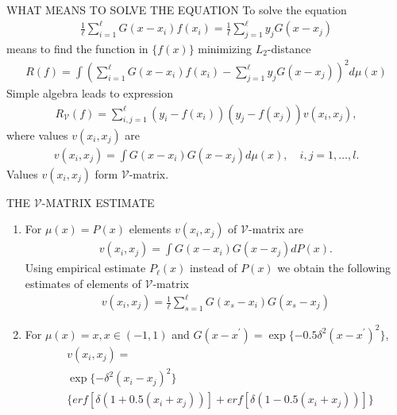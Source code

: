 \documentclass[11pt]{beamer}
\begin{document}
\begin{frame}{WHAT MEANS TO SOLVE THE EQUATION}
To solve the equation
\begin{align*}
\frac{1}{\ell}\sum_{i=1}^{\ell}G(x-x_{i})f(x_{i}) = \frac{1}{\ell}\sum_{j=1}^{\ell}y_{j}G(x-x_{j})
\end{align*}
means to find the function in $\{f(x)\}$ minimizing $L_{2}$-distance
\begin{align*}
R(f) = \int \left( \sum_{i=1}^{\ell}G(x-x_{i})f(x_{i}) - \sum_{j=1}^{\ell}y_{j}G(x-x_{j}) \right)^{2}d\mu(x)
\end{align*}
Simple algebra leads to expression
\begin{align*}
R_{\mathcal{V}}(f) = \sum_{i,j = 1}^{\ell}(y_{i} - f(x_{i}))(y_{j} - f(x_{j}))v(x_{i}, x_{j}),
\end{align*}
where values $v(x_{i}, x_{j})$ are
\begin{align*}
v(x_{i}, x_{j}) = \int G(x-x_{i})G(x-x_{j})d\mu(x), \quad i,j=1,\ldots,l.
\end{align*}
Values $v(x_{i}, x_{j})$ form $\mathcal{V}$-matrix.
\end{frame}


\begin{frame}{THE $\mathcal{V}$-MATRIX ESTIMATE}
\begin{enumerate}
\item For $\mu(x) = P(x)$ elements $v(x_{i}, x_{j})$ of $\mathcal{V}$-matrix are
\begin{align*}
v(x_{i}, x_{j}) = \int G(x-x_{i})G(x-x_{j})dP(x).
\end{align*}
Using empirical estimate $P_{\ell}(x)$ instead of $P(x)$ we obtain the following estimates of elements of $\mathcal{V}$-matrix
\begin{align*}
v(x_{i}, x_{j}) = \frac{1}{\ell}\sum_{s=1}^{\ell}G(x_{s} - x_{i})G(x_{s} - x_{j})
\end{align*}
\item For $\mu(x) = x, x \in (-1, 1)$ and $G(x-x^{\prime}) = \exp\{-0.5\delta^{2}(x-x^{\prime})^{2}\}$,
\begin{align*}
&v(x_{i}, x_{j}) = \\ 
&\exp\{-\delta^{2}(x_{i}- x_{j})^{2}\}\\
&\{erf[\delta(1+0.5(x_{i}+x_{j}))] + erf[\delta(1-0.5(x_{i}+x_{j}))]\}
\end{align*}
\end{enumerate}
\end{frame}
\end{document}
